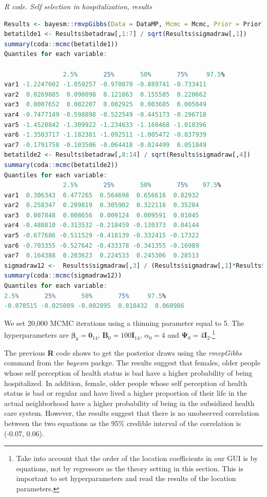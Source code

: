 \begin{tcolorbox}[enhanced,width=4.67in,center upper,
	fontupper=\large\bfseries,drop shadow southwest,sharp corners]
	\textit{R code. Self selection in hospitalization, results}
	\begin{VF}
		\begin{lstlisting}[language=R]
Results <- bayesm::rmvpGibbs(Data = DataMP, Mcmc = Mcmc, Prior = Prior)
betatilde1 <- Results$betadraw[,1:7] / sqrt(Results$sigmadraw[,1])
summary(coda::mcmc(betatilde1))
Quantiles for each variable:

				2.5%       25%       50%       75%     97.5%
var1 -1.2247602 -1.059257 -0.970870 -0.889741 -0.733411
var2  0.0269885  0.090098  0.121863  0.155585  0.220662
var3  0.0007652  0.002207  0.002925  0.003685  0.005049
var4 -0.7477149 -0.598898 -0.522549 -0.445173 -0.296718
var5 -1.4520842 -1.309922 -1.234633 -1.160468 -1.018396
var6 -1.3503717 -1.182381 -1.092511 -1.005472 -0.837939
var7 -0.1791758 -0.103506 -0.064418 -0.024499  0.051849
betatilde2 <- Results$betadraw[,8:14] / sqrt(Results$sigmadraw[,4])
summary(coda::mcmc(betatilde2))
Quantiles for each variable:
				2.5%       25%       50%       75%    97.5%
var1  0.306343  0.477265  0.564698  0.656616  0.82932
var2  0.258347  0.289819  0.305902  0.322116  0.35284
var3  0.007848  0.008656  0.009124  0.009591  0.01045
var4 -0.488810 -0.313532 -0.218459 -0.130373  0.04144
var5 -0.677686 -0.511529 -0.418139 -0.332415 -0.17322
var6 -0.703355 -0.527642 -0.433378 -0.341355 -0.16989
var7  0.164388  0.203623  0.224533  0.245306  0.28513
sigmadraw12 <-  Results$sigmadraw[,3] / (Results$sigmadraw[,1]*Results$sigmadraw[,4])^0.5
summary(coda::mcmc(sigmadraw12))
Quantiles for each variable:
2.5%       25%       50%       75%     97.5% 
-0.070515 -0.025009 -0.002895  0.018432  0.060986
\end{lstlisting}
	\end{VF}
\end{tcolorbox}

We set 20,000 MCMC iterations using a thinning parameter equal to 5. The hyperparameters are $\bm{\beta}_0=\bm{0}_{14}$, $\bm{B}_0=100\bm{I}_{14}$, $\alpha_0=4$ and $\bm{\Psi}_0=4\bm{I}_2$.\footnote{Take into account that the order of the location coefficients in our GUI is by equations, not by regressors as the theory setting in this section. This is important to set hyperparameters and read the results of the location parameters.}

The previous \textbf{R} code shows to get the posterior draws using the \textit{rmvpGibbs} command from the \textit{bayesm} packge. The results suggest that females, older people whose self perception of health status is bad have a higher probability of being hospitalized. In addition, female, older people whose self perception of health status is bad or regular and have lived a higher proportion of their life in the actual neighborhood have a higher probability of being in the subsidized health care system. However, the results suggest that there is no unobserved correlation between the two equations as the 95\% credible interval of the correlation is (-0.07, 0.06).

